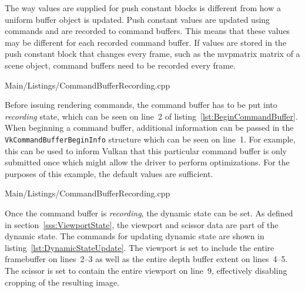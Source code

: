     The way values are supplied for push constant blocks is different from how a uniform buffer object is updated.
    Push constant values are updated using commands and are recorded to command buffers.
    This means that these values may be different for each recorded command buffer.
    If values are stored in the push constant block that changes every frame, such as the \gls{mvpmatrix} matrix of a scene object, command buffers need to be recorded every frame.


      
      {Main/Listings/CommandBufferRecording.cpp}

      Before issuing rendering commands, the command buffer has to be put into \textit{recording} state, which can be seen on line~2 of listing~\ref{lst:BeginCommandBuffer}.
      When beginning a command buffer, additional information can be passed in the \lstinline{VkCommandBufferBeginInfo} structure which can be seen on line~1.
      For example, this can be used to inform Vulkan that this particular command buffer is only submitted once which might allow the \gls{driver} to perform optimizations.
      For the purposes of this example, the default values are sufficient.

      
      {Main/Listings/CommandBufferRecording.cpp}

      Once the command buffer is \textit{recording}, the dynamic state can be set.
      As defined in section~\ref{sss:ViewportState}, the viewport and scissor data are part of the dynamic state.
      The commands for updating dynamic state are shown in listing~\ref{lst:DynamicStateUpdate}.
      The viewport is set to include the entire framebuffer on lines~2--3 as well as the entire depth buffer extent on lines~4--5.
      The scissor is set to contain the entire viewport on line~9, effectively disabling cropping of the resulting image.

